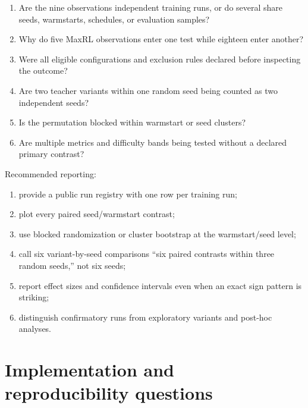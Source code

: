 \documentclass[11pt]{article}
\theoremstyle{definition}
\theoremstyle{remark}
\begin{document}
\begin{questionbox}[title={\textbf{Before reporting a small exact $p$-value}}]
\begin{enumerate}[leftmargin=2em]
\item Are the nine observations independent training runs, or do several share seeds, warmstarts, schedules, or evaluation samples?
\item Why do five MaxRL observations enter one test while eighteen enter another?
\item Were all eligible configurations and exclusion rules declared before inspecting the outcome?
\item Are two teacher variants within one random seed being counted as two independent seeds?
\item Is the permutation blocked within warmstart or seed clusters?
\item Are multiple metrics and difficulty bands being tested without a declared primary contrast?
\end{enumerate}
\end{questionbox}

Recommended reporting:

\begin{enumerate}[leftmargin=2em]
\item provide a public run registry with one row per training run;
\item plot every paired seed/warmstart contrast;
\item use blocked randomization or cluster bootstrap at the warmstart/seed level;
\item call six variant-by-seed comparisons ``six paired contrasts within three random seeds,'' not six seeds;
\item report effect sizes and confidence intervals even when an exact sign pattern is striking;
\item distinguish confirmatory runs from exploratory variants and post-hoc analyses.
\end{enumerate}

\section{Implementation and reproducibility questions}
\end{document}
